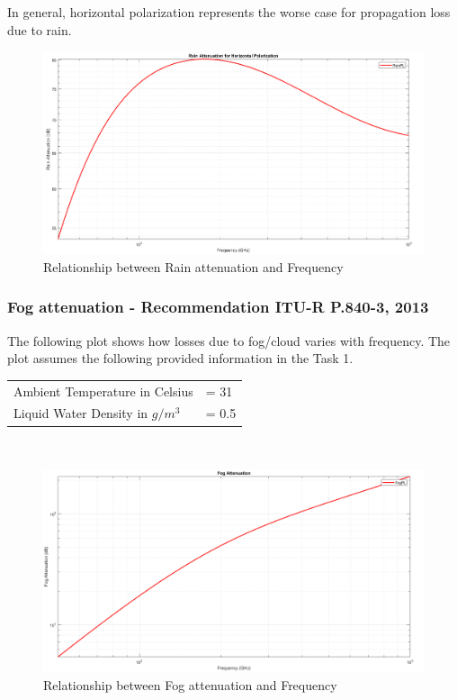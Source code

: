 \documentclass[a4paper,11pt]{article}%
\begin{document}
In general, horizontal polarization represents the worse case for propagation loss due to rain.

\begin{figure}[!h]
	\centering
	\includegraphics[scale=0.35]{figures/RainPL.png}
	\caption{Relationship between Rain attenuation and Frequency}
\end{figure}

\subsubsection{Fog attenuation - Recommendation ITU-R P.840-3, 2013\cite{fog}}
The following plot shows how losses due to fog/cloud varies with frequency. The plot assumes the following provided information in the Task 1.\\

\begin{tabular}{l l}
	Ambient Temperature in Celsius&= 31\\
	Liquid Water Density in $g/m^3$&= 0.5\\
\end{tabular}\\

\begin{figure}[!h]
	\centering
	\includegraphics[scale=0.35]{figures/FogPL.png}
	\caption{Relationship between Fog attenuation  and Frequency}
\end{figure}
\end{document}
